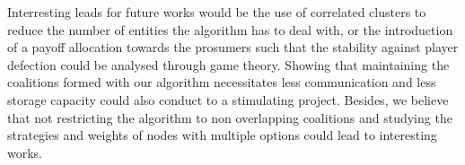 \documentclass[conference]{IEEEtran}
\begin{document}
Interresting leads for future works would be the use of correlated clusters to reduce the number of entities the algorithm has to deal with, or the introduction of a payoff allocation towards the prosumers such that the stability against player defection could be analysed through game theory. Showing that maintaining the coalitions formed with our algorithm necessitates less communication and less storage capacity could also conduct to a stimulating project. Besides, we believe that not restricting the algorithm to non overlapping coalitions and studying the strategies and weights of nodes with multiple options could lead to interesting works.








%
%
%


 
  






\end{document}
